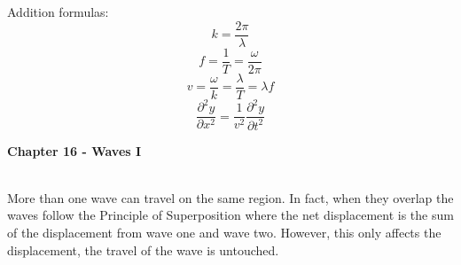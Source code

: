 \documentclass[11pt]{article}
\begin{document}
    \noindent Addition formulas:
    \begin{equation}
        k = \frac{2\pi}{\lambda} \tag{angular wave number}
    \end{equation}
    \begin{equation}
        f = \frac{1}{T} = \frac{\omega}{2\pi} \tag{frequency}
    \end{equation}
    \begin{equation}
        v = \frac{\omega}{k} = \frac{\lambda}{T} = \lambda f \tag{wave velocity}
    \end{equation}
    \begin{equation}
        \frac{\partial^2 y}{\partial x^2} = \frac{1}{v^2} \frac{\partial^2 y}{\partial t^2} \tag{wave equation}
    \end{equation}

    \newpage
    \noindent \textbf{Chapter 16 - Waves I}

    \noindent \\ More than one wave can travel on the same region.
    In fact, when they overlap the waves follow the Principle of Superposition
    where the net displacement is the sum of the displacement from wave one and wave two.
    However, this only affects the displacement, the travel of the wave is untouched.
\end{document}
